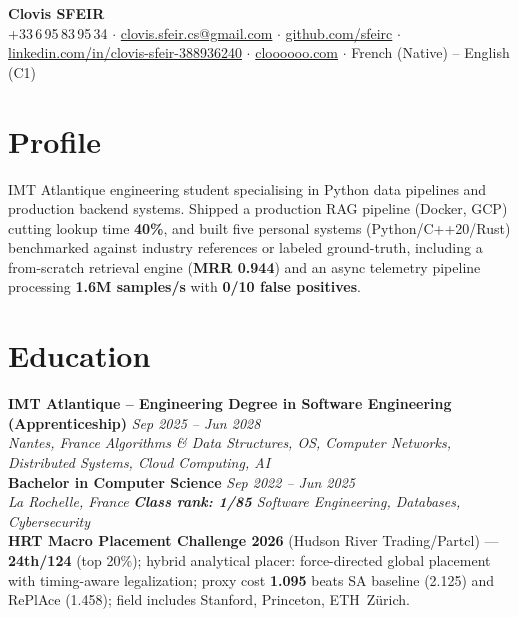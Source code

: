 \documentclass[10pt]{article}
\newcommand{\entry}[4]{%
  \noindent\textbf{#1} \hfill \textit{#2} \\
  \textit{#3} \hfill \textit{#4}\\[-0.3em]
}
\begin{document}
\fontsize{9.3pt}{11pt}\selectfont
\begin{center}
  {\LARGE \textbf{Clovis SFEIR}}\\[0.3em]
  +33\,6\,95\,83\,95\,34 \;$\cdot$\; \href{mailto:clovis.sfeir.cs@gmail.com}{clovis.sfeir.cs@gmail.com} \;$\cdot$\;
  \href{https://github.com/sfeirc}{github.com/sfeirc} \;$\cdot$\;
  \href{https://linkedin.com/in/clovis-sfeir-388936240}{linkedin.com/in/clovis-sfeir-388936240} \;$\cdot$\;
  \href{https://cloooooo.com}{cloooooo.com} \;$\cdot$\; French (Native) -- English (C1)
\end{center}

\section*{Profile}
IMT Atlantique engineering student specialising in Python data pipelines and production backend systems. Shipped a production RAG pipeline (Docker, GCP) cutting lookup time \textbf{40\%}, and built five personal systems (Python/C++20/Rust) benchmarked against industry references or labeled ground-truth, including a from-scratch retrieval engine (\textbf{MRR 0.944}) and an async telemetry pipeline processing \textbf{1.6M samples/s} with \textbf{0/10 false positives}.

\section*{Education}
\entry{IMT Atlantique -- Engineering Degree in Software Engineering (Apprenticeship)}{Sep 2025 -- Jun 2028}{Nantes, France}{Algorithms \& Data Structures, OS, Computer Networks, Distributed Systems, Cloud Computing, AI}
\entry{Bachelor in Computer Science}{Sep 2022 -- Jun 2025}{La Rochelle, France}{\textbf{Class rank: 1/85} \textbar{} Software Engineering, Databases, Cybersecurity}
\noindent\textbf{HRT Macro Placement Challenge 2026} (Hudson River Trading/Partcl) --- \textbf{24th/124} (top 20\%); hybrid analytical placer: force-directed global placement with timing-aware legalization; proxy cost \textbf{1.095} beats SA baseline (2.125) and RePlAce (1.458); field includes Stanford, Princeton, ETH~Z\"urich.
\end{document}

